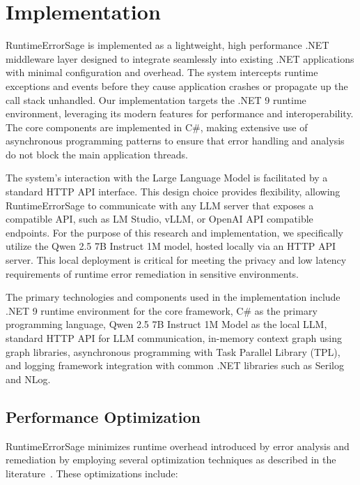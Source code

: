\section{Implementation}\label{sec:implementation}
RuntimeErrorSage is implemented as a lightweight, high performance .NET middleware layer designed to integrate seamlessly into existing .NET applications with minimal configuration and overhead. The system intercepts runtime exceptions and events before they cause application crashes or propagate up the call stack unhandled. Our implementation targets the .NET 9 runtime environment, leveraging its modern features for performance and interoperability. The core components are implemented in C\#, making extensive use of asynchronous programming patterns to ensure that error handling and analysis do not block the main application threads.

The system's interaction with the Large Language Model is facilitated by a standard HTTP API interface. This design choice provides flexibility, allowing RuntimeErrorSage to communicate with any LLM server that exposes a compatible API, such as LM Studio, vLLM, or OpenAI API compatible endpoints. For the purpose of this research and implementation, we specifically utilize the Qwen 2.5 7B Instruct 1M model, hosted locally via an HTTP API server. This local deployment is critical for meeting the privacy and low latency requirements of runtime error remediation in sensitive environments.

The primary technologies and components used in the implementation include .NET 9 runtime environment for the core framework, C\# as the primary programming language, Qwen 2.5 7B Instruct 1M Model as the local LLM, standard HTTP API for LLM communication, in-memory context graph using graph libraries, asynchronous programming with Task Parallel Library (TPL), and logging framework integration with common .NET libraries such as Serilog and NLog.

\subsection{Performance Optimization}
RuntimeErrorSage minimizes runtime overhead introduced by error analysis and remediation by employing several optimization techniques as described in the literature~\cite{llm_inference_optimization_2021, performance_tuning_dotnet_2020}. These optimizations include:

